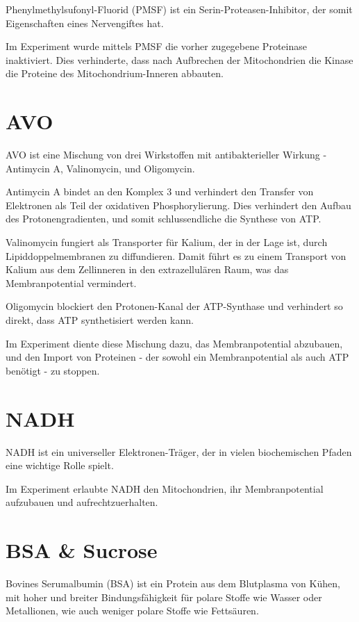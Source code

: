 \documentclass[a4paper,german]{scrreprt}
\begin{document}
Phenylmethylsufonyl-Fluorid (PMSF) ist ein Serin-Proteasen-Inhibitor, der somit
Eigenschaften eines Nervengiftes hat.

Im Experiment wurde mittels PMSF die vorher zugegebene Proteinase
inaktiviert. Dies verhinderte, dass nach Aufbrechen der Mitochondrien die
Kinase die Proteine des Mitochondrium-Inneren abbauten.

\section{AVO}

AVO ist eine Mischung von drei Wirkstoffen mit antibakterieller Wirkung -
Antimycin A, Valinomycin, und Oligomycin.

Antimycin A bindet an den Komplex 3 und verhindert den Transfer von Elektronen
als Teil der oxidativen Phosphorylierung. Dies verhindert den Aufbau des
Protonengradienten, und somit schlussendliche die Synthese von ATP.

Valinomycin fungiert als Transporter für Kalium, der in der Lage ist, durch
Lipiddoppelmembranen zu diffundieren. Damit führt es zu einem Transport von
Kalium aus dem Zellinneren in den extrazellulären Raum, was das
Membranpotential vermindert.

Oligomycin blockiert den Protonen-Kanal der ATP-Synthase und verhindert so
direkt, dass ATP synthetisiert werden kann.

Im Experiment diente diese Mischung dazu, das Membranpotential abzubauen, und den
Import von Proteinen - der sowohl ein Membranpotential als auch ATP benötigt - zu
stoppen.

\section{NADH}

NADH ist ein universeller Elektronen-Träger, der in vielen biochemischen Pfaden
eine wichtige Rolle spielt.

Im Experiment erlaubte NADH den Mitochondrien, ihr Membranpotential aufzubauen
und aufrechtzuerhalten.

\section{BSA \& Sucrose}

Bovines Serumalbumin (BSA) ist ein Protein aus dem Blutplasma von Kühen, mit
hoher und breiter Bindungsfähigkeit für polare Stoffe wie Wasser oder
Metallionen, wie auch weniger polare Stoffe wie Fettsäuren.
\end{document}
